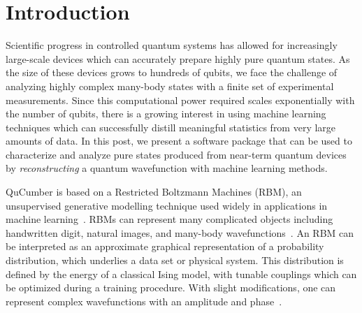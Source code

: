 \documentclass[submission, Phys]{SciPost}
\begin{document}
\section{Introduction}

Scientific progress in controlled quantum systems has allowed for increasingly large-scale devices which can accurately prepare highly pure quantum states.
As the size of these devices grows to hundreds of qubits, we face the challenge of analyzing highly complex many-body states with a finite set of experimental measurements.
Since this computational power required scales exponentially with the number of qubits, there is a growing interest in using machine learning techniques which can successfully distill meaningful statistics from very large amounts of data.
In this post, we present a software package that can be used to characterize and analyze pure states produced from near-term 
quantum devices by {\it reconstructing} a quantum wavefunction with machine learning methods.

QuCumber is based on a Restricted Boltzmann Machines (RBM), an unsupervised generative modelling technique 
used widely in applications in machine learning~\cite{Smolensky}.
RBMs can represent many complicated objects including handwritten digit, natural images, and many-body wavefunctions~\cite{Torlai2016thermo, CarleoTroyer2017Science, ChenWang2018, GlasserCirac2018}.
An RBM can be interpreted as an approximate graphical representation of a probability distribution, which underlies 
a data set or physical system.
This distribution is defined by the energy of a classical Ising model, with tunable couplings which can be optimized during a training procedure.
With slight modifications, one can represent complex wavefunctions with an amplitude and phase~\cite{torlai2018tomography}.
\end{document}
